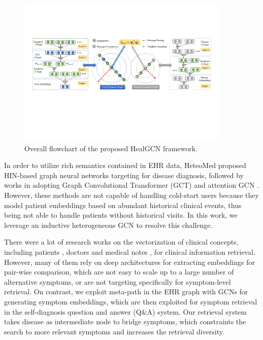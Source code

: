 \documentclass[sigconf]{acmart}
\begin{document}
\begin{figure}[t]
\centering
\includegraphics[width=0.9\textwidth]{fig2.pdf}
\caption{Overall flowchart of the proposed HealGCN framework. \label{fig:2}}
\end{figure}

In order to utilize rich semantics contained in EHR data, HeteoMed \cite{hosseini2018heteromed} proposed HIN-based graph neural networks targeting for disease diagnosis, followed by works in adopting Graph Convolutional Transformer (GCT)  \cite{choi2019graph}  and attention GCN \cite{hosseini2019hierarchical}. However, these methods are not capable of handling cold-start users because they model patient embeddings based on abundant historical clinical events, thus being not able to handle patients without historical visits. In this work, we leverage an inductive heterogeneous GCN to resolve this challenge.

There were a lot of research works on the vectorization of clinical concepts, including patients \cite{zhu2016measuring, zhang2018patient2vec,dligach2018learning}, doctors \cite{biswal2019doctor2vec} and medical notes \cite{galko2018biomedical, wei2018embedding}, for clinical information retrieval. However, many of them rely on deep architectures for extracting embeddings for pair-wise comparison, which are not easy to scale up to a large number of alternative symptoms, or are not targeting specifically for symptom-level retrieval. On contrast, we exploit meta-path in the EHR graph with GCNs for generating symptom embeddings, which are then exploited for symptom retrieval in the self-diagnosis question and answer (Q\&A) system. Our retrieval system takes disease as intermediate node to bridge symptoms, which constraints the search to more relevant symptoms and increases the retrieval diversity.
\end{document}
